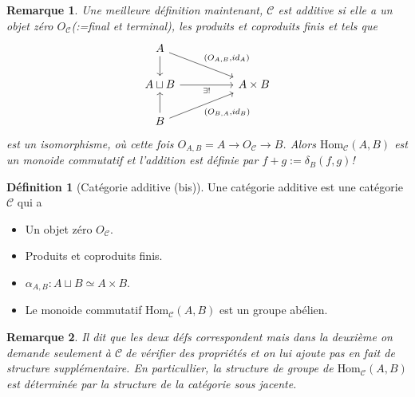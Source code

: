 \documentclass[a4paper,12pt]{book}
\newcommand{\Cat}{\mathcal{C}}
\newcommand{\Hom}{\textrm{Hom}}
\theoremstyle{plain}
\newtheorem{rem}{Remarque}
\theoremstyle{definition}
\newtheorem{defn}[subsection]{Définition}
\theoremstyle{remark}
\begin{document}
\begin{rem}
    Une meilleure définition maintenant, $\Cat$ est additive si
    elle a un objet zéro $O_{\Cat}$(:=final et terminal), les produits et
    coproduits finis et tels que 
\[\begin{tikzcd}
	A \\
	{A\sqcup B} && {A\times B} \\
	B
	\arrow[from=1-1, to=2-1]
	\arrow["{(O_{A,B},id_A)}", from=1-1, to=2-3]
	\arrow["{\exists !}"', from=2-1, to=2-3]
	\arrow[from=3-1, to=2-1]
	\arrow["{(O_{B,A},id_B)}"', from=3-1, to=2-3]
\end{tikzcd}\]
    est un isomorphisme, où cette fois $O_{A,B}=A\to O_{\Cat}\to B$.
    Alors $\Hom_{\Cat}(A,B)$ est un monoide commutatif et l'addition
    est définie par $f+g:=\delta_B(f,g)$!
\end{rem}
\begin{defn}[Catégorie additive (bis)]
    Une catégorie additive est une catégorie $\Cat$ qui a 
    \begin{itemize}
	\item Un objet zéro $O_{\Cat}$.
	\item Produits et coproduits finis.
	\item $\alpha_{A,B}\colon A\sqcup B\simeq A\times B$.
	\item Le monoide commutatif $\Hom_{\Cat}(A,B)$ est
	    un groupe abélien.
    \end{itemize}
\end{defn}
\begin{rem}
    Il dit que les deux défs correspondent mais dans la deuxième on
    demande seulement à $\Cat$de vérifier des propriétés et on lui
    ajoute pas en fait de structure supplémentaire. En particullier,
    la structure de groupe de $\Hom_{\Cat}(A,B)$ est déterminée
    par la structure de la catégorie sous jacente.
\end{rem}




\printbibliography
\end{document}
